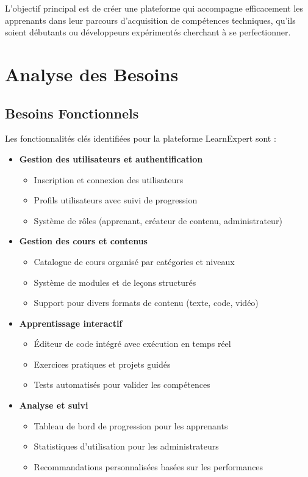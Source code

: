 L'objectif principal est de créer une plateforme qui accompagne efficacement les apprenants dans leur parcours d'acquisition de compétences techniques, qu'ils soient débutants ou développeurs expérimentés cherchant à se perfectionner.

\section{Analyse des Besoins}

\subsection{Besoins Fonctionnels}
Les fonctionnalités clés identifiées pour la plateforme LearnExpert sont :

\begin{itemize}
  \item \textbf{Gestion des utilisateurs et authentification}
    \begin{itemize}
      \item Inscription et connexion des utilisateurs
      \item Profils utilisateurs avec suivi de progression
      \item Système de rôles (apprenant, créateur de contenu, administrateur)
    \end{itemize}
  
  \item \textbf{Gestion des cours et contenus}
    \begin{itemize}
      \item Catalogue de cours organisé par catégories et niveaux
      \item Système de modules et de leçons structurés
      \item Support pour divers formats de contenu (texte, code, vidéo)
    \end{itemize}
  
  \item \textbf{Apprentissage interactif}
    \begin{itemize}
      \item Éditeur de code intégré avec exécution en temps réel
      \item Exercices pratiques et projets guidés
      \item Tests automatisés pour valider les compétences
    \end{itemize}
  
  \item \textbf{Analyse et suivi}
    \begin{itemize}
      \item Tableau de bord de progression pour les apprenants
      \item Statistiques d'utilisation pour les administrateurs
      \item Recommandations personnalisées basées sur les performances
    \end{itemize}
  

\end{itemize}
